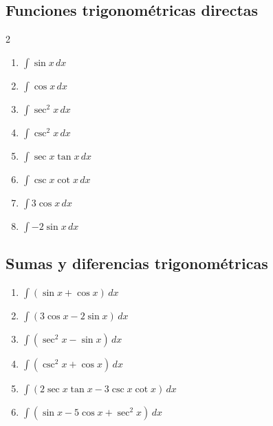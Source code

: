 \documentclass[12pt, letterpaper]{article}
\newcommand{\dx}{\,dx}
\begin{document}
\vspace{4pt}

\subsection{Funciones trigonométricas directas}

\begin{multicols}{2}
\begin{enumerate}[label=\textbf{\arabic*.}, leftmargin=*, itemsep=10pt, start=33]

  \item \facil\quad $\displaystyle\int \sin x \dx$

  \item \facil\quad $\displaystyle\int \cos x \dx$

  \item \facil\quad $\displaystyle\int \sec^2 x \dx$

  \item \facil\quad $\displaystyle\int \csc^2 x \dx$

  \item \facil\quad $\displaystyle\int \sec x\tan x \dx$

  \item \facil\quad $\displaystyle\int \csc x\cot x \dx$

  \item \facil\quad $\displaystyle\int 3\cos x \dx$

  \item \facil\quad $\displaystyle\int -2\sin x \dx$

\end{enumerate}
\end{multicols}

\subsection{Sumas y diferencias trigonométricas}

\begin{enumerate}[label=\textbf{\arabic*.}, leftmargin=*, itemsep=12pt, start=41]

  \item \facil\quad
    $\displaystyle\int (\sin x + \cos x)\dx$

  \item \facil\quad
    $\displaystyle\int (3\cos x - 2\sin x)\dx$

  \item \medio\quad
    $\displaystyle\int \left(\sec^2 x - \sin x\right)\dx$

  \item \medio\quad
    $\displaystyle\int \left(\csc^2 x + \cos x\right)\dx$

  \item \medio\quad
    $\displaystyle\int \left(2\sec x\tan x - 3\csc x\cot x\right)\dx$

  \item \medio\quad
    $\displaystyle\int \left(\sin x - 5\cos x + \sec^2 x\right)\dx$

\end{enumerate}
\end{document}
